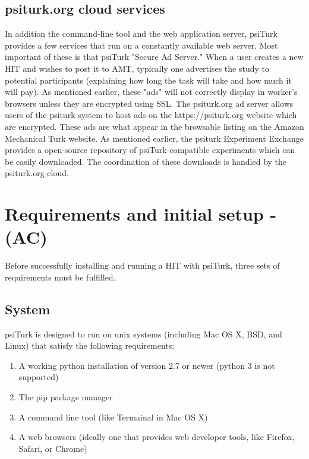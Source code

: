 \documentclass[twocolumn]{svjour3}          %
\begin{document}
\subsection{\textsf{psiturk.org} cloud services}
In addition the command-line tool and the web application server, \textsf{psiTurk}
provides a few services that run on a constantly available web server.
Most important of these is that psiTurk "Secure Ad Server."  When a user
creates a new HIT and wishes to post it to AMT, typically one advertises the
study to potential participants (explaining how long the task will take and how
much it will pay).  As mentioned earlier, these "ads" will not correctly display
in worker's browsers unless they are encrypted using SSL.  The \textsf{psiturk.org}
ad server allows users of the psiturk system to host ads on the \textsf{https://psiturk.org}
website which are encrypted.  These ads are what appear in the browsable listing
on the Amazon Mechanical Turk website.
As mentioned earlier, the psiturk Experiment Exchange provides
a open-source repository of \textsf{psiTurk}-compatible experiments which can be 
easily downloaded.  The coordination of these downloads is handled by the \textsf{psiturk.org} cloud.


\section{Requirements and initial setup - (AC)}
Before successfully installing and running a HIT with psiTurk, three sets of requirements must be fulfilled.

\subsection{System}
psiTurk is designed to run on unix systems (including Mac OS X, BSD, and Linux) that satisfy the following requirements:

\begin{enumerate}
\item A working python installation of version 2.7 or newer (python 3 is not supported)
\item The pip package manager 
\item A command line tool (like Termainal in Mac OS X)
\item A web browsers (ideally one that provides web developer tools, like Firefox, Safari, or Chrome)
\end{enumerate}
\end{document}

